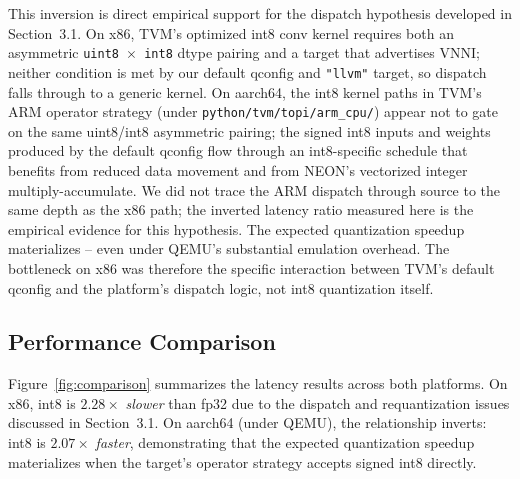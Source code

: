 \documentclass[11pt,a4paper]{article}
\begin{document}
This inversion is direct empirical support for the dispatch hypothesis developed in Section~3.1. On x86, TVM's optimized int8 conv kernel requires both an asymmetric \texttt{uint8 $\times$ int8} dtype pairing and a target that advertises VNNI; neither condition is met by our default qconfig and \texttt{"llvm"} target, so dispatch falls through to a generic kernel. On aarch64, the int8 kernel paths in TVM's ARM operator strategy (under \texttt{python/tvm/topi/\allowbreak arm\_cpu/}) appear not to gate on the same uint8/int8 asymmetric pairing; the signed int8 inputs and weights produced by the default qconfig flow through an int8-specific schedule that benefits from reduced data movement and from NEON's vectorized integer multiply-accumulate. We did not trace the ARM dispatch through source to the same depth as the x86 path; the inverted latency ratio measured here is the empirical evidence for this hypothesis. The expected quantization speedup materializes -- even under QEMU's substantial emulation overhead. The bottleneck on x86 was therefore the specific interaction between TVM's default qconfig and the platform's dispatch logic, not int8 quantization itself.


\subsection{Performance Comparison}

Figure~\ref{fig:comparison} summarizes the latency results across both platforms. On x86, int8 is $2.28\times$ \emph{slower} than fp32 due to the dispatch and requantization issues discussed in Section~3.1. On aarch64 (under QEMU), the relationship inverts: int8 is $2.07\times$ \emph{faster}, demonstrating that the expected quantization speedup materializes when the target's operator strategy accepts signed int8 directly.
\end{document}
